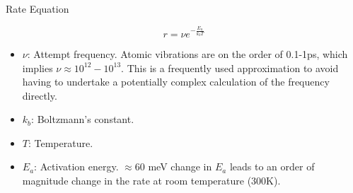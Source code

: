 \documentclass[aspectratio=169]{beamer}
\begin{document}
    \begin{frame}{Rate Equation}

        \begin{equation*}
            r = \nu e^{-\frac{E_a}{k_bT}}
        \end{equation*}

        \begin{itemize}
            \item $\nu$: Attempt frequency. Atomic vibrations are on the order of 0.1-1ps, which implies $\nu \approx 10^{12}-10^{13}$. This is a frequently used approximation to avoid having to undertake a potentially complex calculation of the frequency directly.
            \item $k_b$: Boltzmann's constant.
            \item $T$: Temperature.
            \item $E_a$: Activation energy. $\approx 60$ meV change in $E_a$ leads to an order of magnitude change in the rate at room temperature (300K).
        \end{itemize}

    \end{frame}
\end{document}

